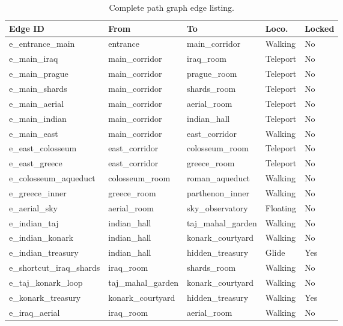 \begin{table}[h!]
\centering
\renewcommand{\arraystretch}{1.3}
\setlength{\tabcolsep}{4pt}
\footnotesize
\begin{tabular}{|p{4.0cm}|p{3.0cm}|p{3.0cm}|p{2.0cm}|p{1.5cm}|}
\hline
\textbf{Edge ID} & \textbf{From} & \textbf{To} & \textbf{Loco.} & \textbf{Locked} \\
\hline
e\_entrance\_main      & entrance         & main\_corridor     & Walking  & No \\\hline
e\_main\_iraq          & main\_corridor   & iraq\_room         & Teleport & No \\\hline
e\_main\_prague        & main\_corridor   & prague\_room       & Teleport & No \\\hline
e\_main\_shards        & main\_corridor   & shards\_room       & Teleport & No \\\hline
e\_main\_aerial        & main\_corridor   & aerial\_room       & Teleport & No \\\hline
e\_main\_indian        & main\_corridor   & indian\_hall       & Teleport & No \\\hline
e\_main\_east          & main\_corridor   & east\_corridor     & Walking  & No \\\hline
e\_east\_colosseum     & east\_corridor   & colosseum\_room    & Teleport & No \\\hline
e\_east\_greece        & east\_corridor   & greece\_room       & Teleport & No \\\hline
e\_colosseum\_aqueduct & colosseum\_room  & roman\_aqueduct    & Walking  & No \\\hline
e\_greece\_inner       & greece\_room     & parthenon\_inner   & Walking  & No \\\hline
e\_aerial\_sky         & aerial\_room     & sky\_observatory   & Floating & No \\\hline
e\_indian\_taj         & indian\_hall     & taj\_mahal\_garden & Walking  & No \\\hline
e\_indian\_konark      & indian\_hall     & konark\_courtyard  & Walking  & No \\\hline
e\_indian\_treasury    & indian\_hall     & hidden\_treasury   & Glide    & Yes \\\hline
e\_shortcut\_iraq\_shards & iraq\_room    & shards\_room       & Walking  & No \\\hline
e\_taj\_konark\_loop   & taj\_mahal\_garden & konark\_courtyard & Walking & No \\\hline
e\_konark\_treasury    & konark\_courtyard & hidden\_treasury  & Walking  & Yes \\\hline
e\_iraq\_aerial        & iraq\_room       & aerial\_room       & Walking  & No \\\hline
\end{tabular}
\caption{Complete path graph edge listing.}
\label{tab:edges}
\end{table}

